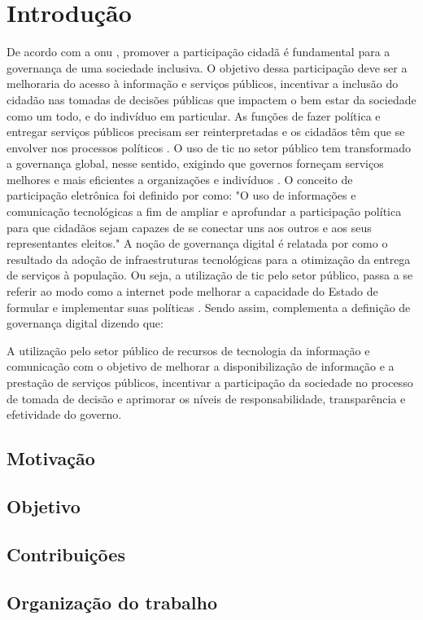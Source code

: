 \chapter[Introdução]{Introdução}
\par
De acordo com a \acrlong{onu} \cite{onu2018}, promover a participação cidadã é fundamental para a governança de uma sociedade inclusiva.
O objetivo dessa participação deve ser a melhoraria do acesso à informação e serviços públicos,
incentivar a inclusão do cidadão nas tomadas de decisões públicas que impactem o bem estar da sociedade como um todo, e do indivíduo em particular. 
As funções de fazer política e entregar serviços públicos precisam ser reinterpretadas e os cidadãos têm que se envolver nos processos políticos \cite{bovaird2007beyond}. 
O uso de \acrfull{tic} no setor público tem transformado a governança global, nesse sentido, exigindo que governos forneçam
serviços melhores e mais eficientes a organizações e indivíduos \cite{afdb2014uneca}. O conceito de participação eletrônica foi definido por \cite{macintosh2008democracy} como:
"O uso de informações e comunicação tecnológicas a fim de ampliar e aprofundar a participação política para que cidadãos sejam capazes de se conectar 
uns aos outros e aos seus representantes eleitos."
A noção de governança digital é relatada por \cite{reddick2012public} como o resultado da adoção de infraestruturas tecnológicas para a otimização da entrega de serviços à população.
Ou seja, a utilização de \acrshort{tic} pelo setor público, passa a se referir ao modo como a internet pode melhorar a capacidade do Estado de formular
e implementar suas políticas \cite{parra2017governancca}. Sendo assim, \cite{germani2016desafios} complementa a definição de governança digital dizendo que:

\hspace{4cm}
\begin{minipage}{.66\textwidth}		
    \begin{singlespace}
        \fontsize{10}{12}\selectfont A utilização pelo setor público de recursos de tecnologia da informação e comunicação com o objetivo de melhorar a disponibilização de informação e a prestação de serviços públicos,
        incentivar a participação da sociedade no processo de tomada de decisão e aprimorar os níveis de responsabilidade, transparência e efetividade do governo.    
        \end{singlespace}
\end{minipage}


    
\section{Motivação}

\section{Objetivo}

\section{Contribuições}

\section{Organização do trabalho}